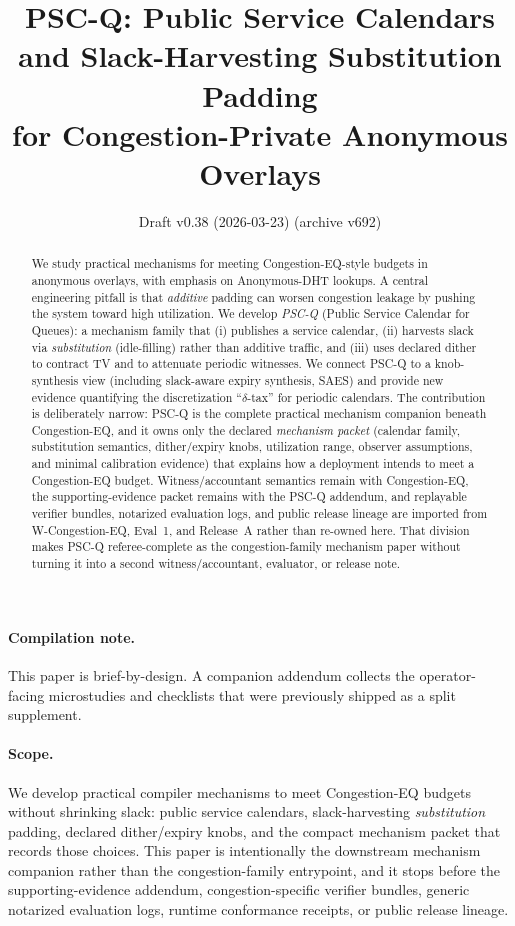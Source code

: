 \documentclass[11pt]{article}
\title{PSC-Q: Public Service Calendars and Slack-Harvesting Substitution Padding \\ for Congestion-Private Anonymous Overlays}
\author{}
\date{Draft v0.38 (2026-03-23) (archive v692)}
\theoremstyle{definition}
\theoremstyle{remark}
\begin{document}
\maketitle

\begin{abstract}
We study practical mechanisms for meeting Congestion-EQ-style budgets in anonymous overlays, with emphasis on Anonymous-DHT lookups.
A central engineering pitfall is that \emph{additive} padding can worsen congestion leakage by pushing the system toward high utilization.
We develop \emph{PSC-Q} (Public Service Calendar for Queues): a mechanism family that (i) publishes a service calendar, (ii) harvests slack via \emph{substitution} (idle-filling) rather than additive traffic, and (iii) uses declared dither to contract TV and to attenuate periodic witnesses.
We connect PSC-Q to a knob-synthesis view (including slack-aware expiry synthesis, SAES) and provide new evidence quantifying the discretization ``$\delta$-tax'' for periodic calendars.
The contribution is deliberately narrow: PSC-Q is the complete practical mechanism companion beneath Congestion-EQ, and it owns only the declared \emph{mechanism packet} (calendar family, substitution semantics, dither/expiry knobs, utilization range, observer assumptions, and minimal calibration evidence) that explains how a deployment intends to meet a Congestion-EQ budget.
Witness/accountant semantics remain with Congestion-EQ, the supporting-evidence packet remains with the PSC-Q addendum, and replayable verifier bundles, notarized evaluation logs, and public release lineage are imported from W-Congestion-EQ, Eval~1, and Release~A rather than re-owned here. That division makes PSC-Q referee-complete as the congestion-family mechanism paper without turning it into a second witness/accountant, evaluator, or release note.
\end{abstract}
\paragraph{Compilation note.}
This paper is brief-by-design. A companion addendum collects the operator-facing microstudies and checklists that were previously shipped as a split supplement.\cite{series:pscqaddendum}

\paragraph{Scope.}
We develop practical compiler mechanisms to meet Congestion-EQ budgets without shrinking slack: public service calendars, slack-harvesting \emph{substitution} padding, declared dither/expiry knobs, and the compact mechanism packet that records those choices.
This paper is intentionally the downstream mechanism companion rather than the congestion-family entrypoint, and it stops before the supporting-evidence addendum, congestion-specific verifier bundles, generic notarized evaluation logs, runtime conformance receipts, or public release lineage.\cite{series:pscqaddendum,series:wcongeq,series:evalnotary,series:opb,anondht_release_receipts}
\end{document}
